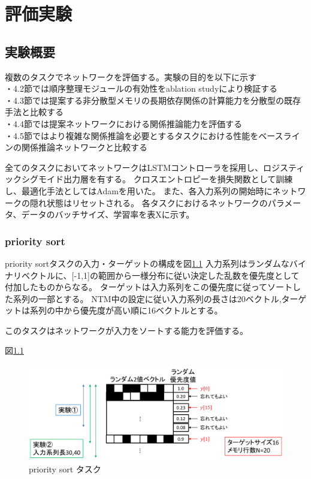 \chapter{評価実験}

\label{chap:evaluation}

\section{実験概要}
複数のタスクでネットワークを評価する。実験の目的を以下に示す
\\・4.2節では順序整理モジュールの有効性をablation studyにより検証する
\\・4.3節では提案する非分散型メモリの長期依存関係の計算能力を分散型の既存手法と比較する
\\・4.4節では提案ネットワークにおける関係推論能力を評価する
\\・4.5節ではより複雑な関係推論を必要とするタスクにおける性能をベースラインの関係推論ネットワークと比較する

全てのタスクにおいてネットワークはLSTMコントローラを採用し、ロジスティックシグモイド出力層を有する。
クロスエントロピーを損失関数として訓練し、最適化手法としてはAdamを用いた。
また、各入力系列の開始時にネットワークの隠れ状態はリセットされる。
各タスクにおけるネットワークのパラメータ、データのバッチサイズ、学習率を表Xに示す。

\subsection{priority sort}
priority sortタスクの入力・ターゲットの構成を図\ref{fig:priority}
入力系列はランダムなバイナリベクトルに、[-1,1]の範囲から一様分布に従い決定した乱数を優先度として付加したものからなる。
ターゲットは入力系列をこの優先度に従ってソートした系列の一部とする。
NTM中の設定に従い入力系列の長さは20ベクトル,ターゲットは系列の中から優先度が高い順に16ベクトルとする。

このタスクはネットワークが入力をソートする能力を評価する。

図\ref{fig:priority}
\begin{figure}[t]
	\centering
	\includegraphics[width=\linewidth]{./figure/img_slide/priority.png}
	\caption{priority sort タスク}
	\label{fig:priority}
\end{figure}

